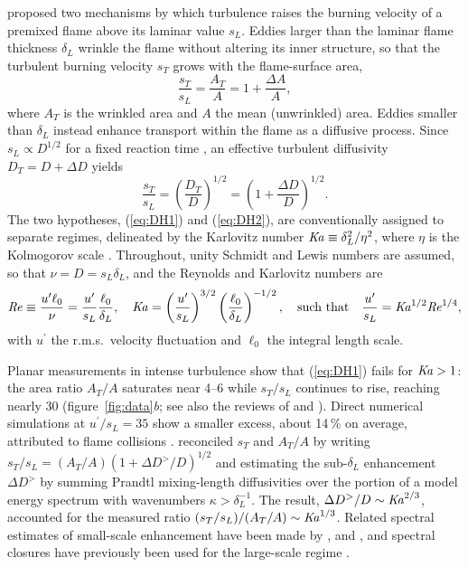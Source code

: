 \documentclass[lineno]{jfm}
\providecommand{\Rey}{\mbox{\textit{Re}}}
\providecommand{\Ka}{\mbox{\textit{Ka}}}
\newcommand{\sL}{s_L}
\newcommand{\dL}{\delta_L}
\newcommand{\up}{u^{\prime}}
\begin{document}
\citet{Damkohler1940} proposed two mechanisms by which turbulence raises the burning velocity of a premixed flame above its laminar value $\sL$. Eddies larger than the laminar flame thickness $\dL$ wrinkle the flame without altering its inner structure, so that the turbulent burning velocity $s_T$ grows with the flame-surface area,
\begin{equation}
  \frac{s_T}{\sL} = \frac{A_T}{A} = 1 + \frac{\Delta A}{A},
  \label{eq:DH1}
\end{equation}
where $A_T$ is the wrinkled area and $A$ the mean (unwrinkled) area. Eddies smaller than $\dL$ instead enhance transport within the flame as a diffusive process. Since $\sL \propto D^{1/2}$ for a fixed reaction time \citep{ZeldovichFK1938}, an effective turbulent diffusivity $D_T = D + \Delta D$ yields
\begin{equation}
  \frac{s_T}{\sL} = \left(\frac{D_T}{D}\right)^{1/2} = \left(1 + \frac{\Delta D}{D}\right)^{1/2}.
  \label{eq:DH2}
\end{equation}
The two hypotheses, (\ref{eq:DH1}) and (\ref{eq:DH2}), are conventionally assigned to separate regimes, delineated by the Karlovitz number $\Ka \equiv \dL^2 / \eta^2$, where $\eta$ is the Kolmogorov scale \citep{Peters1999,Peters2000}. Throughout, unity Schmidt and Lewis numbers are assumed, so that $\nu = D = \sL \dL$, and the Reynolds and Karlovitz numbers are
\begin{equation}
  \Rey \equiv \frac{\up \ell_0}{\nu} = \frac{\up}{\sL} \frac{\ell_0}{\dL}, \quad
  \Ka = \left(\frac{\up}{\sL}\right)^{3/2} \left(\frac{\ell_0}{\dL}\right)^{-1/2},
  \quad \mbox{such that} \quad \frac{\up}{\sL} = \Ka^{1/2} \Rey^{1/4},
  \label{eq:groups}
\end{equation}
with $\up$ the r.m.s.\ velocity fluctuation and $\ell_0$ the integral length scale.

Planar measurements in intense turbulence \citep{YuenGulder2013,Wabel2017} show that (\ref{eq:DH1}) fails for $\Ka > 1$: the area ratio $A_T / A$ saturates near 4--6 while $s_T / \sL$ continues to rise, reaching nearly 30 (figure~\ref{fig:data}\textit{b}; see also the reviews of \citealt{Driscoll2020} and \citealt{Hochgreb2023}). Direct numerical simulations at $\up / \sL = 35$ show a smaller excess, about 14\,\% on average, attributed to flame collisions \citep{PoludnenkoOran2011,Hicks2015}. \citet{Nivarti2019} reconciled  $s_T$ and $A_T/A$ by writing $s_T / \sL = (A_T / A)(1 + \Delta D^{>} / D)^{1/2}$ and estimating the sub-$\dL$ enhancement $\Delta D^{>}$ by summing Prandtl mixing-length diffusivities over the portion of a model energy spectrum with wavenumbers $\kappa > \dL^{-1}$. The result, $\Delta D^{>} / D \sim \Ka^{2/3}$, accounted for the measured ratio $(s_T / \sL) / (A_T / A) \sim \Ka^{1/3}$. Related spectral estimates of small-scale enhancement have been made by \citet{Zimont1979}, \citet{RonneyYakhot1992} and \citet{Gulder2007}, and spectral closures have previously been used for the large-scale regime \citep{Peters1992,Chaudhuri2011,Chaudhuri2012}.
\end{document}
